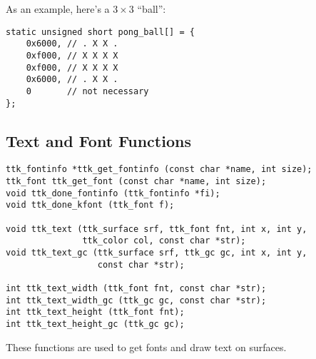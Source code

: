 \documentclass[12pt,letterpaper]{report}
\begin{document}
As an example, here's a $3\times3$ ``ball'':
\begin{verbatim}
static unsigned short pong_ball[] = {
    0x6000, // . X X .
    0xf000, // X X X X
    0xf000, // X X X X
    0x6000, // . X X .
    0       // not necessary
};
\end{verbatim}

\subsection{Text and Font Functions}
\begin{verbatim}
ttk_fontinfo *ttk_get_fontinfo (const char *name, int size);
ttk_font ttk_get_font (const char *name, int size);
void ttk_done_fontinfo (ttk_fontinfo *fi);
void ttk_done_kfont (ttk_font f);

void ttk_text (ttk_surface srf, ttk_font fnt, int x, int y,
               ttk_color col, const char *str);
void ttk_text_gc (ttk_surface srf, ttk_gc gc, int x, int y,
                  const char *str);

int ttk_text_width (ttk_font fnt, const char *str);
int ttk_text_width_gc (ttk_gc gc, const char *str);
int ttk_text_height (ttk_font fnt);
int ttk_text_height_gc (ttk_gc gc);
\end{verbatim}

These functions are used to get fonts and draw text on surfaces.
\end{document}
